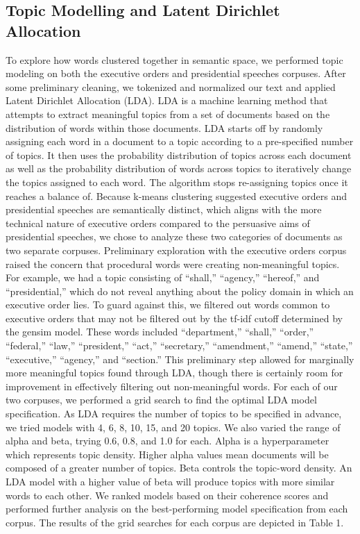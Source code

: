 \documentclass{article}
\begin{document}
{\subsection{Topic Modelling and Latent Dirichlet Allocation}{To explore how words clustered together in semantic space, we performed topic modeling on both the executive orders and presidential speeches corpuses. After some preliminary cleaning, we tokenized and normalized our text and applied Latent Dirichlet Allocation (LDA). LDA is a machine learning method that attempts to extract meaningful topics from a set of documents based on the distribution of words within those documents. LDA starts off by randomly assigning each word in a document to a topic according to a pre-specified number of topics. It then uses the probability distribution of topics across each document as well as the probability distribution of words across topics to iteratively change the topics assigned to each word. The algorithm stops re-assigning topics once it reaches a balance of. 
Because k-means clustering suggested executive orders and presidential speeches are semantically distinct, which aligns with the more technical nature of executive orders compared to the persuasive aims of presidential speeches, we chose to analyze these two categories of documents as two separate corpuses. 
Preliminary exploration with the executive orders corpus raised the concern that procedural words were creating non-meaningful topics. For example, we had a topic consisting of “shall,” “agency,” “hereof,” and “presidential,” which do not reveal anything about the policy domain in which an executive order lies. To guard against this, we filtered out words common to executive orders that may not be filtered out by the tf-idf cutoff determined by the gensim model. These words included “department,” “shall,” “order,” “federal,” “law,” “president,” “act,” “secretary,” “amendment,” “amend,” “state,” “executive,” “agency,” and “section.” This preliminary step allowed for marginally more meaningful topics found through LDA, though there is certainly room for improvement in effectively filtering out non-meaningful words. 
For each of our two corpuses, we performed a grid search to find the optimal LDA model specification. As LDA requires the number of topics to be specified in advance, we tried models with 4, 6, 8, 10, 15, and 20 topics. We also varied the range of alpha and beta, trying 0.6, 0.8, and 1.0 for each. Alpha is a hyperparameter which represents topic density. Higher alpha values mean documents will be composed of a greater number of topics. Beta controls the topic-word density. An LDA model with a higher value of beta will produce topics with more similar words to each other. We ranked models based on their coherence scores and performed further analysis on the best-performing model specification from each corpus. The results of the grid searches for each corpus are depicted in Table 1.
}

}
\end{document}
